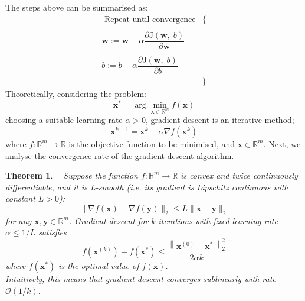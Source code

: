 \documentclass[12pt]{report}
\newtheorem{thm}{Theorem}[section]
\numberwithin{equation}{section}
\begin{document}
The steps above can be summarised as;
\[\begin{array}{rc}
\text{ Repeat until convergence} & \{  \\ 
 & \\
\bm{w}  :=  \bm{w} - \alpha \dfrac{\partial \mathrm{J}(\bm{w},\;b)}{\partial \bm{w}} & \\ \\
b  :=  b - \alpha \dfrac{\partial \mathrm{J}(\bm{w},\;b)}{\partial b} \\
& \}  
\end{array}\]
Theoretically, considering the problem:
\[
\bm{x}^{*}=\arg \min _{\bm{x} \in \mathbb{R}^{m}} f(\bm{x})
\]
choosing a suitable learning rate $\alpha > 0$, gradient descent is an iterative method;
\begin{equation}\label{eqn:gd}
\bm{x}^{k+1} = \bm{x}^k - \alpha \nabla f(\bm{x}^k)
\end{equation}
where $f:\mathbb{R}^m \rightarrow \mathbb{R}$ is the objective function to be minimised, and $\bm{x} \in \mathbb{R}^m$. Next, we analyse the convergence rate of the gradient descent algorithm. 

\begin{thm}\label{thm:gd_converge}
\normalfont \textbf{~\cite{bottou2018optimization}}
Suppose the function $f: \mathbb{R}^{m} \rightarrow \mathbb{R}$ is convex and twice continuously differentiable, and it is L-smooth (i.e. its gradient is Lipschitz continuous with constant $L>0$): 
\begin{equation}\label{eqn:lipschitz}
\|\nabla f(\bm{x})-\nabla f(\bm{y})\|_{2} \leq L\|\bm{x}-\bm{y}\|_{2}
\end{equation}
for any $\bm{x}, \bm{y}\in \mathbb{R}^m$. Gradient descent for $k$ iterations with  fixed learning rate $\alpha \leq 1 / L$  satisfies
\begin{equation}\label{eqn:sublinear_conv}
f\left(\bm{x}^{(k)}\right)-f\left(\bm{x}^{*}\right) \leq \frac{\left\|\bm{x}^{(0)}-\bm{x}^{*}\right\|_{2}^{2}}{2 \alpha k}
\end{equation}
where $f\left(\bm{x}^{*}\right)$ is the optimal value of $f(\bm{x})$. \\ Intuitively, this means that gradient descent converges sublinearly with rate $\mathcal{O}(1 / k)$. %
\end{thm}
\end{document}
